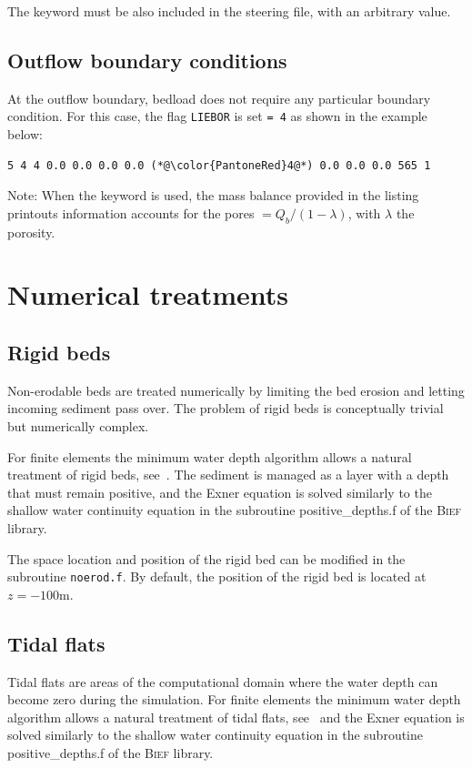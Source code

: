 The keyword  must be also included in the steering file, with an arbitrary value.

\subsection{Outflow boundary conditions}
At the outflow boundary, bedload does not require any particular boundary condition.
For this case, the flag \texttt{LIEBOR} is set \texttt{= 4} as shown in the example below:

\begin{lstlisting}[frame=trBL]
5 4 4 0.0 0.0 0.0 0.0 (*@\color{PantoneRed}4@*) 0.0 0.0 0.0 565 1
\end{lstlisting}

\begin{WarningBlock}{Note:}
When the keyword  is used, the mass balance provided in the listing printouts information accounts for the pores $=Q_b/(1-\lambda)$, with $\lambda$ the porosity.
\end{WarningBlock}

\section{Numerical treatments}
\subsection{Rigid beds}
Non-erodable beds are treated numerically by limiting the bed erosion and letting incoming sediment pass over. The problem of rigid beds is conceptually trivial but numerically complex. 

For finite elements the minimum water depth algorithm allows a natural treatment of rigid
beds, see~\cite{Hervouet11}. The sediment is managed as a layer with a
depth that must remain positive, and the Exner equation is solved similarly to the shallow water continuity equation in the subroutine {\ttfamily positive\_depths.f} of the \textsc{Bief} library.

The space location and position of the rigid bed can be modified in the subroutine \texttt{noerod.f}. By default, the position of the rigid bed is located at $z=-100$m.

\subsection{Tidal flats}
Tidal flats are areas of the computational domain where the water depth can become zero during the simulation. For finite elements the minimum water depth algorithm allows a natural treatment of tidal flats, see~\cite{Hervouet11} and the Exner equation is solved similarly to the shallow water continuity equation in the subroutine {\ttfamily positive\_depths.f} of the \textsc{Bief} library.

